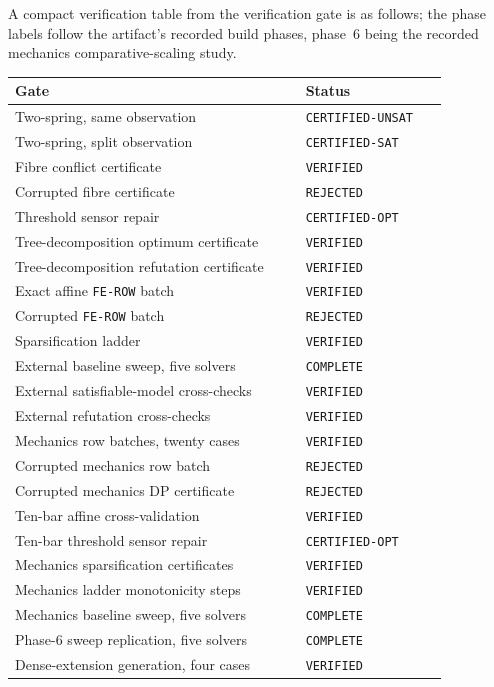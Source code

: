 \documentclass[11pt]{article}
\theoremstyle{plain}
\theoremstyle{definition}
\theoremstyle{remark}
\begin{document}
A compact verification table from the verification gate is as follows; the
phase labels follow the artifact's recorded build phases, phase~6 being the
recorded mechanics comparative-scaling study.
\begin{center}
\begin{tabular}{@{}p{0.58\linewidth}p{0.28\linewidth}@{}}
\toprule
Gate & Status\\
\midrule
Two-spring, same observation & \texttt{CERTIFIED-UNSAT}\\
Two-spring, split observation & \texttt{CERTIFIED-SAT}\\
Fibre conflict certificate & \texttt{VERIFIED}\\
Corrupted fibre certificate & \texttt{REJECTED}\\
Threshold sensor repair & \texttt{CERTIFIED-OPT}\\
Tree-decomposition optimum certificate & \texttt{VERIFIED}\\
Tree-decomposition refutation certificate & \texttt{VERIFIED}\\
Exact affine \texttt{FE-ROW} batch & \texttt{VERIFIED}\\
Corrupted \texttt{FE-ROW} batch & \texttt{REJECTED}\\
Sparsification ladder & \texttt{VERIFIED}\\
External baseline sweep, five solvers & \texttt{COMPLETE}\\
External satisfiable-model cross-checks & \texttt{VERIFIED}\\
External refutation cross-checks & \texttt{VERIFIED}\\
Mechanics row batches, twenty cases & \texttt{VERIFIED}\\
Corrupted mechanics row batch & \texttt{REJECTED}\\
Corrupted mechanics DP certificate & \texttt{REJECTED}\\
Ten-bar affine cross-validation & \texttt{VERIFIED}\\
Ten-bar threshold sensor repair & \texttt{CERTIFIED-OPT}\\
Mechanics sparsification certificates & \texttt{VERIFIED}\\
Mechanics ladder monotonicity steps & \texttt{VERIFIED}\\
Mechanics baseline sweep, five solvers & \texttt{COMPLETE}\\
Phase-6 sweep replication, five solvers & \texttt{COMPLETE}\\
Dense-extension generation, four cases & \texttt{VERIFIED}\\

\end{tabular}
\end{center}
\end{document}
